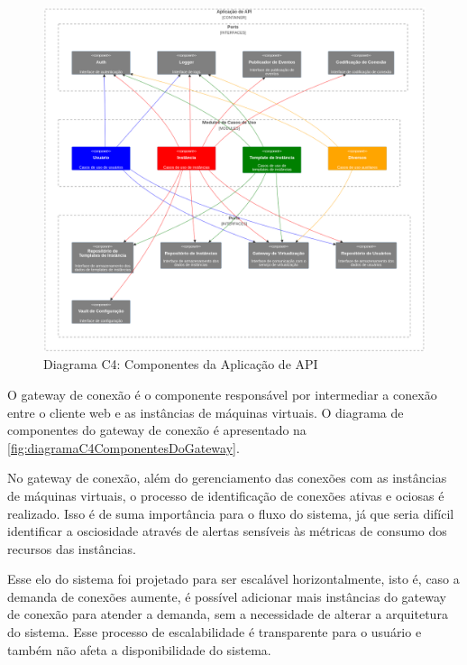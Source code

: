 \begin{figure}[H]
\caption{Diagrama C4: Componentes da Aplicação de API}
\label{fig:diagramaC4ComponentesDaAPI}
\includegraphics[width=\textwidth]{capitulos/2-metodologia/files/c4-component-api.png}
\end{figure}

O gateway de conexão é o componente responsável por intermediar a conexão entre o cliente web e as instâncias de máquinas virtuais. O diagrama de componentes do gateway de conexão é apresentado na \autoref{fig:diagramaC4ComponentesDoGateway}.

No gateway de conexão, além do gerenciamento das conexões com as instâncias de máquinas virtuais, o processo de identificação de conexões ativas e ociosas é realizado. Isso é de suma importância para o fluxo do sistema, já que seria difícil identificar a osciosidade através de alertas sensíveis às métricas de consumo dos recursos das instâncias.

Esse elo do sistema foi projetado para ser escalável horizontalmente, isto é, caso a demanda de conexões aumente, é possível adicionar mais instâncias do gateway de conexão para atender a demanda, sem a necessidade de alterar a arquitetura do sistema. Esse processo de escalabilidade é transparente para o usuário e também não afeta a disponibilidade do sistema.

